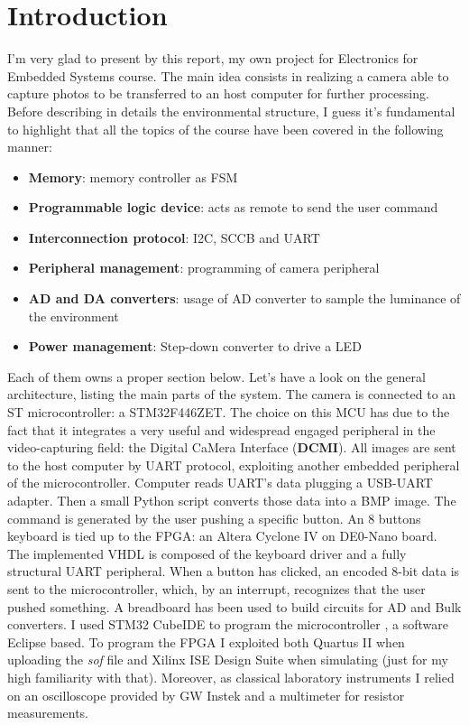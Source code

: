 \section{Introduction}
I'm very glad to present by this report, my own project for Electronics for Embedded Systems course. The main idea consists in  realizing a camera able to capture photos to be transferred to an host computer for further processing. Before describing in details the environmental structure, I guess it's fundamental to highlight that all the topics of the course have been covered in the following manner:
\begin{itemize}
\item \textbf{Memory}: memory controller as FSM
\item \textbf{Programmable logic device}: acts as remote to send the user command
\item \textbf{Interconnection protocol}: I2C, SCCB and UART
\item \textbf{Peripheral management}: programming of camera peripheral
\item \textbf{AD and DA converters}: usage of AD converter to sample the luminance of the environment
\item \textbf{Power management}: Step-down converter to drive a LED
\end{itemize}
Each of them owns a proper section below.
Let's have a look on the general architecture, listing the main parts of the system. The camera is connected to an ST microcontroller: a STM32F446ZET. The choice on this MCU has due to the fact that it integrates a very useful and widespread engaged peripheral in the video-capturing field: the Digital CaMera Interface (\textbf{DCMI}). All images are sent to the host computer by UART protocol, exploiting another embedded peripheral of the microcontroller. Computer reads UART's data plugging a USB-UART adapter.  Then a small Python script converts those data into a BMP image. 
The command is generated by the user pushing a specific button. An 8 buttons keyboard is tied up to the FPGA: an Altera Cyclone IV on DE0-Nano board. The implemented VHDL is composed of the keyboard driver and a fully structural UART peripheral. When a button has clicked, an encoded 8-bit data is sent to the microcontroller, which, by an interrupt, recognizes that the user pushed something. 
A breadboard has been used to build circuits for AD and Bulk converters. 
I used STM32 CubeIDE to program the microcontroller , a software Eclipse based. To program the FPGA I exploited both Quartus II when uploading the \textit{sof} file and Xilinx ISE Design Suite when simulating (just for my high familiarity with that). Moreover, as classical laboratory instruments I relied on an oscilloscope provided by GW Instek and a multimeter for resistor measurements.
